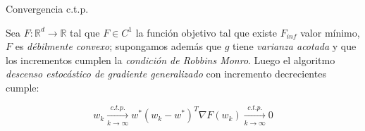 \documentclass{beamer}
\newcommand{\R}{{\mathbb{R}}}
\begin{document}
\begin{frame}{Convergencia c.t.p.}
\begin{theorem}
	Sea $F: \R^d \rightarrow \R$ tal que $F \in C^1$ la funci\'on objetivo tal que existe $F_{inf}$ valor m\'inimo, $F$ es \textit{d\'ebilmente convexo}; supongamos adem\'as que $g$ tiene \textit{varianza acotada} y que los incrementos cumplen la \textit{condici\'on de Robbins Monro}. Luego el algoritmo \textit{descenso estoc\'astico de gradiente generalizado} con incremento decrecientes cumple:
	
	\begin{subequations}
		\begin{equation*}
		w_k \xrightarrow[k \rightarrow \infty]{c.t.p.} w^*
		\end{equation*}
		\begin{equation*}
		\left(w_k - w^*\right)^T \nabla F(w_k) \xrightarrow[k \rightarrow \infty]{c.t.p.}  0
		\end{equation*}
	\end{subequations}
	
\end{theorem}
\end{frame}
\end{document}
